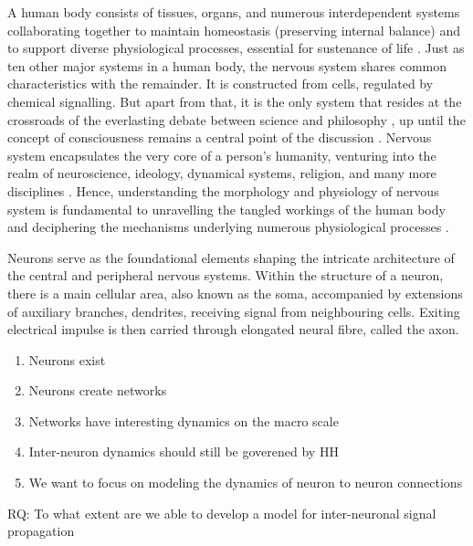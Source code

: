 \documentclass[class={myRUCProject}, crop=false]{standalone}
\begin{document}

A human body consists of tissues, organs, and numerous interdependent systems collaborating together to maintain homeostasis (preserving internal balance) and to support diverse physiological processes, essential for sustenance of life \cite{inbook2023Com}. Just as ten other major systems in a human body, the nervous system shares common characteristics with the remainder. It is constructed from cells, regulated by chemical signalling. \cite{SHOYKHET2011783} But apart from that, it is the only system that resides at the crossroads of the everlasting debate between science and philosophy \cite{SHOYKHET2011783, cons2002}, up until the concept of consciousness remains a central point of the discussion \cite{cons2002}. Nervous system encapsulates the very core of a person's humanity, venturing into the realm of neuroscience, ideology, dynamical systems, religion, and many more disciplines \cite{SHOYKHET2011783,cons2002}. Hence, understanding the morphology and physiology of nervous system is fundamental to unravelling the tangled workings of the human body and deciphering the mechanisms underlying numerous physiological processes \cite{SHOYKHET2011783}.

Neurons serve as the foundational elements shaping the intricate architecture of the central and peripheral nervous systems. \cite{shadizadeh2022investigating} Within the structure of a neuron, there is a main cellular area, also known as the soma, accompanied by extensions of auxiliary branches, dendrites, receiving signal from neighbouring cells. Exiting electrical impulse is then carried through elongated neural fibre, called the axon. \cite{njitacke2020hidden} 





\begin{enumerate}
    \item Neurons exist
    \item Neurons  create networks
    \item Networks have interesting dynamics on the macro scale
    \item Inter-neuron dynamics should still be goverened by HH
    \item We want to focus on modeling the dynamics of neuron to neuron connections
\end{enumerate}

RQ: To what extent are we able to develop a model for inter-neuronal signal propagation
\end{document}
